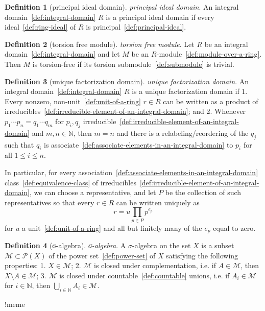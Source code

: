 \documentclass[12pt,a4paper]{article}
\theoremstyle{definition}
\newtheorem{definition}{Definition}
\begin{document}
\begin{definition}[principal ideal domain]\label{def:principal-ideal-domain}
\emph{principal ideal domain}. An integral domain~\ref{def:integral-domain} $R$ is a principal ideal domain if every ideal~\ref{def:ring-ideal} of $R$ is principal~\ref{def:principal-ideal}.
\end{definition}

\begin{definition}[torsion free module]\label{def:torsion-free-module}
\emph{torsion free module}. Let $R$ be an integral domain~\ref{def:integral-domain} and let $M$ be an $R$-module~\ref{def:module-over-a-ring}. Then $M$ is torsion-free if its torsion submodule~\ref{def:submodule} is trivial.
\end{definition}

\begin{definition}[unique factorization domain]\label{def:unique-factorization-domain}
\emph{unique factorization domain}. An integral domain~\ref{def:integral-domain} $R$ is a unique factorization domain if
1. Every nonzero, non-unit~\ref{def:unit-of-a-ring} $r\in R$ can be written as a product of irreducibles~\ref{def:irreducible-element-of-an-integral-domain}; and
2. Whenever $p_1\cdots p_n=q_1\cdots q_m$ for $p_i,q_j$ irreducible~\ref{def:irreducible-element-of-an-integral-domain} and $m,n\in\mathbb N$, then $m=n$ and there is a relabeling/reordering of the $q_j$ such that $q_i$ is associate~\ref{def:associate-elements-in-an-integral-domain} to $p_i$ for all $1\leq i\leq n$.

In particular, for every association~\ref{def:associate-elements-in-an-integral-domain} class~\ref{def:equivalence-class} of irreducibles~\ref{def:irreducible-element-of-an-integral-domain}, we can choose a representative, and let $P$ be the collection of such representatives so that every $r\in R$ can be written uniquely as $$r= u\prod_{p\in P} p^{e_p}$$ for $u$ a unit~\ref{def:unit-of-a-ring} and all but finitely many of the $e_p$ equal to zero.
\end{definition}

\begin{definition}[σ-algebra]\label{def:σ-algebra}
\emph{σ-algebra}. A $\sigma$-algebra on the set $X$ is a subset $\mathcal M \subset \mathcal P(X)$ of the power set~\ref{def:power-set} of $X$ satisfying the following properties:
1. $X \in \mathcal M$;
2. $\mathcal M$ is closed under complementation, i.e. if $A \in \mathcal M$, then $X\setminus A \in \mathcal M$;
3. $\mathcal M$ is closed under countable~\ref{def:countable} unions, i.e. if $A_i \in \mathcal M$ for $i \in \mathbb N$, then $\bigcup\limits_{i\in\mathbb N} A_i \in \mathcal M$.

!meme
\end{definition}
\end{document}
